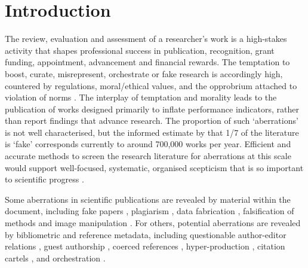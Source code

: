 \documentclass[10pt]{article}
\begin{document}
\section{Introduction}

The review, evaluation and assessment of a researcher's work is a high-stakes activity that shapes professional success in publication, recognition, grant funding, appointment, advancement and financial rewards. The temptation to boost, curate, misrepresent, orchestrate or fake research is accordingly high, countered by regulations, moral/ethical values, and the opprobrium attached to violation of norms \citep{mertonSocialStructureScience1996}. The interplay of temptation and morality leads to the publication of works designed primarily to inflate performance indicators, rather than report findings that advance research. The proportion of such `aberrations' is not well characterised, but the informed estimate by \cite{jamesheathersApproximately172025} that 1/7 of the literature is `fake' corresponds currently to around 700,000 works per year. Efficient and accurate methods to screen the research literature for aberrations at this scale would support well-focused, systematic, organised scepticism that is so important to scientific progress \cite[Chapt. 9]{zimanRealScienceWhat2001}.

Some aberrations in scientific publications are revealed by material within the document, including fake papers \citep{elseFightFakepaperFactories2021}, plagiarism \citep{longRespondingPossiblePlagiarism2009}, data fabrication \citep{brownIssuesDataAnalyses2018}, falsification of methods \citep{simonsohnJustPostIt2013} and image manipulation \citep{bikPrevalenceInappropriateImage2016}. For others, potential aberrations are revealed by bibliometric and reference metadata, including questionable author-editor relations \citep{banksElsevierChallengedJournal2009}, guest authorship \citep{khezrVexingPersistentProblem2022}, coerced references \citep{straubJournalSelfCitationVI2009}, hyper-production \citep{ioannidisFeaturesSignalsPrecocious2024a}, citation cartels \citep{safonScreeningArticlesCitation2025}, and orchestration \citep{evdaimonMetricsDetectSmallScale2024}.
\end{document}
